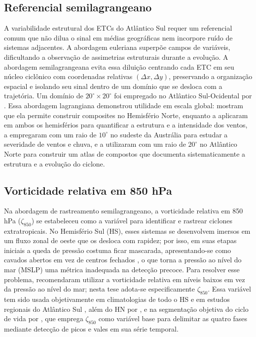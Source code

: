 \subsection{Referencial semilagrangeano}\label{subsec:tb_lagrangiano}
A variabilidade estrutural dos ETCs do Atlântico Sul requer um referencial comum que não dilua o sinal em médias geográficas nem incorpore ruído de sistemas adjacentes.
A abordagem euleriana superpõe campos de variáveis, dificultando a observação de assimetrias estruturais durante a evolução.
A abordagem semilagrangeana evita essa diluição centrando cada ETC em seu núcleo ciclônico com coordenadas relativas $(\Delta x, \Delta y)$, preservando a organização espacial e isolando seu sinal dentro de um domínio que se desloca com a trajetória.
Um domínio de $20^{\circ} \times 20^{\circ}$ foi empregado no Atlântico Sul-Ocidental por \citet{cardoso2022synoptic}.
Essa abordagem lagrangiana demonstrou utilidade em escala global: \citet{laurila2021characteristics} mostram que ela permite construir composites no Hemisfério Norte, enquanto \citet{priestley2022improved} a aplicaram em ambos os hemisférios para quantificar a estrutura e a intensidade dos ventos, \citet{pepler2020dimensional} a empregaram com um raio de $10^{\circ}$ no sudeste da Austrália para estudar a severidade de ventos e chuva, e \citet{dacre2012atlas} a utilizaram com um raio de $20^{\circ}$ no Atlântico Norte para construir um atlas de compostos que documenta sistematicamente a estrutura e a evolução do ciclone.

\subsection{Vorticidade relativa em 850 hPa}\label{subsec:tb_zeta}
Na abordagem de rastreamento semilagrangeano, a vorticidade relativa em 850 hPa ($\zeta_{850}$) se estabeleceu como a variável para identificar e rastrear ciclones extratropicais.
No Hemisfério Sul (HS), esses sistemas se desenvolvem imersos em um fluxo zonal de oeste que os desloca com rapidez; por isso, em suas etapas iniciais a queda de pressão costuma ficar mascarada, apresentando-se como cavados abertos em vez de centros fechados \citep{sinclair1994objective}, o que torna a pressão ao nível do mar (MSLP) uma métrica inadequada na detecção precoce.
Para resolver esse problema, \citet{sinclair1997objective} recomendaram utilizar a vorticidade relativa em níveis baixos em vez da pressão ao nível do mar; nesta tese adota-se especificamente $\zeta_{850}$.
Essa variável tem sido usada objetivamente em climatologias de todo o HS \citep{padilhareinke2024objective} e em estudos regionais do Atlântico Sul \citep{gramcianinov2019properties}, além do HN por \citet{corner2025classification}, e na segmentação objetiva do ciclo de vida por \citet{coutodesouza2024new}, que emprega $\zeta_{850}$ como variável base para delimitar as quatro fases mediante detecção de picos e vales em sua série temporal.

